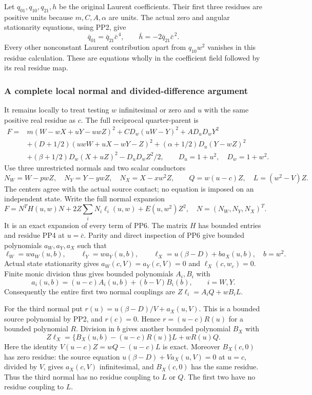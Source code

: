 Let $q_{01},q_{10},q_{21},h$ be the original Laurent coefficients.
Their first three residues are positive units because $m,C,A,\alpha$
are units. The actual zero and angular stationarity equations,
using PP2, give
\[
 \bar q_{01}=\bar q_{21}\bar c^{\,4},\qquad
 \bar h=-2\bar q_{21}\bar c^{\,2}.
 \tag{PP5}
\]
Every other nonconstant Laurent contribution apart from $q_{10}w^2$
vanishes in this residue calculation. These are equations wholly in
the coefficient field followed by its real residue map.

\subsubsection*{A complete local normal and divided-difference argument}

It remains locally to treat testing $w$ infinitesimal or zero and
$u$ with the same positive real residue as $c$. The full reciprocal
quarter-parent is
\[
\begin{split}
 F={}&m(W-wX+uY-uwZ)^2+CD_w(uW-Y)^2+AD_uD_wY^2\\
 &+(D+1/2)(uwW+uX-wY-Z)^2
       +(\alpha+1/2)D_u(Y-wZ)^2\\
 &+(\beta+1/2)D_w(X+uZ)^2-D_uD_wZ^2/2,
 \qquad D_u=1+u^2,\quad D_w=1+w^2.
\end{split}\tag{PP6}
\]
Use three unrestricted normals and two scalar conductors
\[
 N_W=W-pwZ,\quad N_Y=Y-ywZ,\quad N_X=X-xw^2Z,
 \qquad Q=w(u-c)Z,\quad L=(w^2-V)Z.
 \tag{PP7}
\]
The centers agree with the actual source contact; no equation is
imposed on an independent state. Write the full normal expansion
\[
 F=N^TH(u,w)N+2Z\sum_iN_i\ell_i(u,w)+E(u,w^2)Z^2,
 \quad N=(N_W,N_Y,N_X)^T.
 \tag{PP8}
\]
It is an exact expansion of every term of PP6. The matrix $H$ has
bounded entries and residue PP4 at $u=\bar c$. Parity and direct
inspection of PP6 give bounded polynomials $a_W,a_Y,a_X$ such that
\[
 \ell_W=w a_W(u,b),\qquad \ell_Y=w a_Y(u,b),\qquad
 \ell_X=u(\beta-D)+b a_X(u,b),\quad b=w^2.
 \tag{PP9}
\]
Actual state stationarity gives $a_W(c,V)=a_Y(c,V)=0$ and
$\ell_X(c,w_c)=0$. Finite monic division thus gives bounded
polynomials $A_i,B_i$ with
\[
 a_i(u,b)=(u-c)A_i(u,b)+(b-V)B_i(b),\qquad i=W,Y.
\]
Consequently the entire first two normal couplings are
$Z\ell_i=A_iQ+wB_iL$.

For the third normal put
$r(u)=u(\beta-D)/V+a_X(u,V)$. This is a bounded source
polynomial by PP2, and $r(c)=0$. Hence $r=(u-c)R(u)$ for
a bounded polynomial $R$. Division in $b$ gives another bounded
polynomial $B_X$ with
\[
 Z\ell_X=\{B_X(u,b)-(u-c)R(u)\}L+wR(u)Q.
 \tag{PP10}
\]
Here the identity $V(u-c)Z=wQ-(u-c)L$ is exact. Moreover
$B_X(c,0)$ has zero residue: the source equation
$u(\beta-D)+Va_X(u,V)=0$ at $u=c$, divided by $V$,
gives $a_X(c,V)$ infinitesimal, and $B_X(c,0)$ has the same
residue. Thus the third normal has no residue coupling to $L$
or $Q$. The first two have no residue coupling to $L$.

